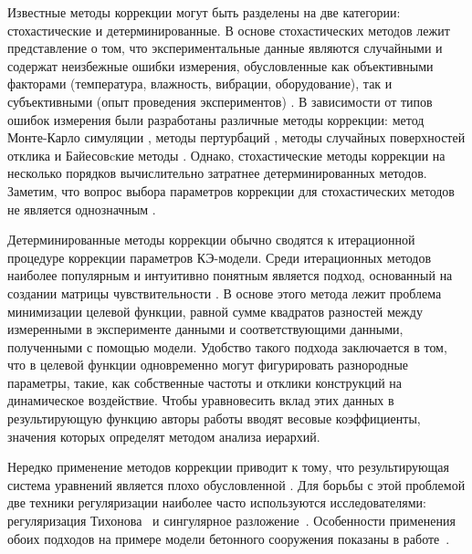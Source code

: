 Известные методы коррекции могут быть разделены на две категории: стохастические и детерминированные. В основе стохастических методов лежит представление о том, что экспериментальные данные являются случайными и содержат неизбежные ошибки измерения, обусловленные как объективными факторами (температура, влажность, вибрации, оборудование), так и субъективными (опыт проведения экспериментов) \cite{lib:modelUpdating:Huang}. В зависимости от типов ошибок измерения были разработаны различные методы коррекции: метод Монте-Карло симуляции \cite{lib:modelUpdating:Bao, lib:modelUpdating:Boulkaibet}, методы пертурбаций \cite{lib:modelUpdating:Wang&He, lib:modelUpdating:Deng}, методы случайных поверхностей отклика \cite{lib:modelUpdating:Zhai&Fei, lib:modelUpdating:Fang} и Байесовcкие методы \cite{lib:modelUpdating:Xin&Hao, lib:modelUpdating:Lam}. Однако, стохастические методы коррекции на несколько порядков вычислительно затратнее детерминированных методов. Заметим, что вопрос выбора параметров коррекции для стохастических методов не является однозначным \cite{lib:modelUpdating:Yuan&Liang}.

Детерминированные методы коррекции обычно сводятся к итерационной процедуре коррекции параметров КЭ-модели. Среди итерационных методов наиболее популярным и интуитивно понятным является подход, основанный на создании матрицы чувствительности \cite{lib:modelUpdating:Mottershead, lib:modelUpdating:Bakir, lib:modelUpdating:Min, lib:modelUpdating:Hernandez}. В основе этого метода лежит проблема минимизации целевой функции, равной сумме квадратов разностей между измеренными в эксперименте данными и соответствующими данными, полученными с помощью модели. Удобство такого подхода заключается в том, что в целевой функции одновременно могут фигурировать разнородные параметры, такие, как собственные частоты и отклики конструкций на динамическое воздействие. Чтобы уравновесить вклад этих данных в результирующую функцию авторы работы \cite{lib:modelUpdating:Chen&Guo} вводят весовые коэффициенты, значения которых определят методом анализа иерархий.
 
Нередко применение методов коррекции приводит к тому, что результирующая система уравнений является плохо обусловленной \cite{lib:modelUpdating:Hua}. Для борьбы с этой проблемой две техники регуляризации наиболее часто используются исследователями: регуляризация Тихонова~\cite{lib:modelUpdating:Li&Law, lib:modelUpdating:Reumers} и сингулярное разложение~\cite{lib:modelUpdating:Mantilla-Gaviria}. Особенности применения обоих подходов на примере модели бетонного сооружения показаны в работе~\cite{lib:modelUpdating:Weber}.

